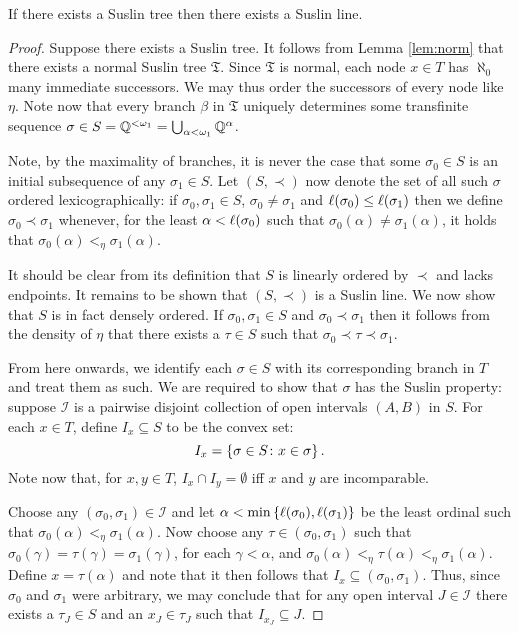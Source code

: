 \begin{lem}\label{lem:tline}
	If there exists a Suslin tree then there exists a Suslin line.
\end{lem}
\begin{proof}
	Suppose there exists a Suslin tree.  It follows from Lemma \ref{lem:norm}
	that there exists a normal Suslin tree $\mathfrak{T}$.  Since $\mathfrak{T}$ is
	normal, each node $x\in T$ has $\aleph_0$ many immediate successors.  We may
	thus order the successors of every node like $\eta$.  Note now that every
	branch $\beta$ in $\mathfrak{T}$ uniquely determines some transfinite sequence
	$\sigma\in S=\mathbb{Q}^{<\omega_1}=\bigcup_{\alpha<\omega_1}\mathbb{Q}^\alpha$.

	Note, by the maximality of branches, it is never the case that some
	$\sigma_0\in S$ is an initial subsequence of any $\sigma_1\in S$.  Let
	$(S,\prec)$ now denote the set of all such $\sigma$ ordered lexicographically:
	if $\sigma_0,\sigma_1\in S$, $\sigma_0\neq\sigma_1$ and
	$\ell(\sigma_0)\leq\ell(\sigma_1)$ then we define $\sigma_0\prec\sigma_1$
	whenever, for the least $\alpha<\ell(\sigma_0)$ such that
	$\sigma_0(\alpha)\neq\sigma_1(\alpha)$, it holds that
	$\sigma_0(\alpha)<_{\eta}\sigma_1(\alpha)$.

	It should be clear from its definition that $S$ is linearly ordered by
	$\prec$ and lacks endpoints.  It remains to be shown that $(S,\prec)$ is a
	Suslin line.  We now show that $S$ is in fact densely ordered.  If
	$\sigma_0,\sigma_1\in S$ and $\sigma_0\prec\sigma_1$ then it follows from the
	density of $\eta$ that there exists a $\tau\in S$ such that
	$\sigma_0\prec\tau\prec\sigma_1$.

    From here onwards, we identify each $\sigma\in S$ with its corresponding
    branch in $T$ and treat them as such.  We are required to show that $\sigma$
    has the Suslin property:  suppose $\mathcal{I}$ is a pairwise disjoint
    collection of open intervals $(A,B)$ in $S$.  For each $x\in T$, define
    $I_x\subseteq S$ to be the convex set:
	\begin{equation}
		I_x=\left\lbrace \sigma\in S\colon x\in \sigma \right\rbrace.
	\end{equation}
	Note now that, for $x,y\in T$, $I_x\cap I_y=\emptyset$ iff $x$ and $y$ are
	incomparable.

	Choose any $(\sigma_0,\sigma_1)\in\mathcal{I}$ and let
	$\alpha<\min\left\lbrace \ell(\sigma_0),\ell(\sigma_1)\right\rbrace$ be the least ordinal such
	that $\sigma_0(\alpha)<_{\eta}\sigma_1(\alpha)$.  Now choose any
	$\tau\in(\sigma_0,\sigma_1)$ such that
	$\sigma_0(\gamma)=\tau(\gamma)=\sigma_1(\gamma)$, for each $\gamma<\alpha$, and
	$\sigma_0(\alpha)<_{\eta}\tau(\alpha)<_{\eta}\sigma_1(\alpha)$.  Define $x=\tau(\alpha)$ and
	note that it then follows that $I_x\subseteq(\sigma_0,\sigma_1)$.  Thus, since
	$\sigma_0$ and $\sigma_1$ were arbitrary, we may conclude that for any open
	interval $J\in\mathcal{I}$ there exists a $\tau_J\in S$ and an $x_J\in\tau_J$
	such that $I_{x_J}\subseteq J$.


\end{proof}
